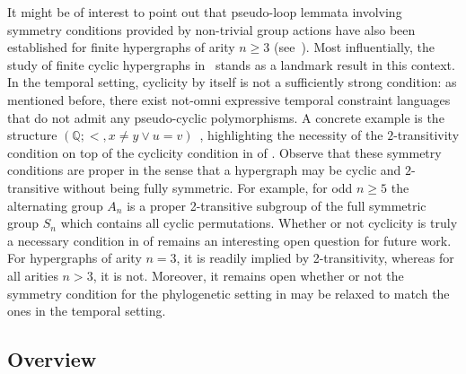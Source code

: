 \documentclass[a4paper,reqno, cleveref]{amsart}
\newcommand{\Q}{\mathbb{Q}}
\begin{document}
It might be of interest to point out  that pseudo-loop lemmata involving symmetry  conditions provided by  non-trivial group actions have also been established for finite hypergraphs of arity $n \geq 3$ (see~\cite{Cyclic,Zhuk2020StrongSA,Brunar-diplom,zhuksimplifiedproof}).
%
Most influentially, the study of finite cyclic hypergraphs in~\cite{Cyclic} stands as a landmark result in this context. 
%
In the temporal setting, cyclicity by itself is not a sufficiently strong condition: as mentioned before, there exist not-omni expressive temporal constraint languages that do not admit any pseudo-cyclic polymorphisms. A concrete example is the structure $(\Q; <, x\neq y \vee u = v)$~\cite[Section 12.9.1]{Book}, highlighting
 the necessity of  the $2$-transitivity condition  on top of the cyclicity condition in  of .
%
Observe that these symmetry conditions are proper in the sense that a hypergraph may be
cyclic and $2$-transitive without being fully symmetric. %
For example, for odd $n\geq 5$ the alternating group $A_n$ is a proper 2-transitive subgroup of the full symmetric group $S_n$ which contains all cyclic permutations.  
 Whether or not cyclicity is truly a necessary condition in  of  remains an interesting open question for future work. For hypergraphs of arity $n=3$,  it is readily implied by 2-transitivity, whereas for all arities $n >3$, it is not. Moreover, it remains open whether or not the symmetry condition for the phylogenetic setting in  may be relaxed to match the ones in the temporal setting. 

 \subsection{Overview}
\end{document}
